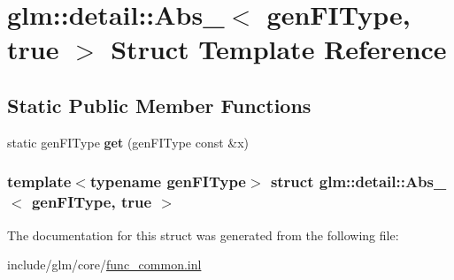 \hypertarget{structglm_1_1detail_1_1Abs___3_01genFIType_00_01true_01_4}{\section{glm\-:\-:detail\-:\-:\-Abs\-\_\-$<$ gen\-F\-I\-Type, true $>$ \-Struct \-Template \-Reference}
\label{structglm_1_1detail_1_1Abs___3_01genFIType_00_01true_01_4}
}
\subsection*{\-Static \-Public \-Member \-Functions}
\begin{DoxyCompactItemize}
\item 
\hypertarget{structglm_1_1detail_1_1Abs___3_01genFIType_00_01true_01_4_a070ff71ec02bcd5b7ecab9ee75b6eb99}{static gen\-F\-I\-Type {\bfseries get} (gen\-F\-I\-Type const \&x)}\label{structglm_1_1detail_1_1Abs___3_01genFIType_00_01true_01_4_a070ff71ec02bcd5b7ecab9ee75b6eb99}

\end{DoxyCompactItemize}
\subsubsection*{template$<$typename gen\-F\-I\-Type$>$ struct glm\-::detail\-::\-Abs\-\_\-$<$ gen\-F\-I\-Type, true $>$}



\-The documentation for this struct was generated from the following file\-:\begin{DoxyCompactItemize}
\item 
include/glm/core/\hyperlink{func__common_8inl}{func\-\_\-common.\-inl}\end{DoxyCompactItemize}
